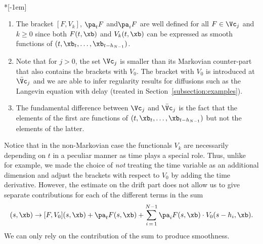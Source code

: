 \begin{rema}\ \\*[-1em]
\begin{enumerate}\romanenumi
\item \label{1.3.1}The bracket $[F,V_k]$, $\pa_t F$ and$\pa_i F$ are well defined for all $F\in \Vc_j$ and\linebreak $k\geq 0$ since both $F(t,\xb)$ and $V_k(t,\xb)$ can be expressed as smooth functions of $(t,\xb_t,\dots, \xb_{t-h_{N-1}})$.

\item \label{1.3.2}Note that for $j>0$, the set $ \Vc_j$ is smaller than its Markovian counter-part that also contains the brackets with $V_0$. The bracket with $V_0$ is introduced at $\bar \Vc_j$ and we are able to infer regularity results for diffusions such as the Langevin equation with delay (treated in Section~\ref{subsection:examples}).

\item \label{1.3.3} The fundamental difference between $ \Vc_j$ and $\bar \Vc_j$ is the fact that the elements of the first are functions of $(t,\xb_t,\dots, \xb_{t-h_{N-1}})$ but not the elements of the latter.
\end{enumerate}
\end{rema}

Notice that in the non-Markovian case the functionals $V_k$ are necessarily depending on $t$ in a peculiar manner as time plays a special role. Thus, unlike~\cite{Hairer11} for example, we made the choice of \emph{not} treating the time variable as an additional dimension and adjust the brackets with respect to $V_0$ by adding the time derivative. However, the estimate on the drift part does not allow us to give separate contributions for each of the different terms in the sum
\[
(s,\xb)\to[F,V_0](s,\xb)+\pa_t F(s,\xb) +\sum_{i\,=\,1}^{N-1} \pa_i F(s,\xb) \cdot V_0(s-h_i,\xb).
\]
We can only rely on the contribution of the sum to produce smoothness.

